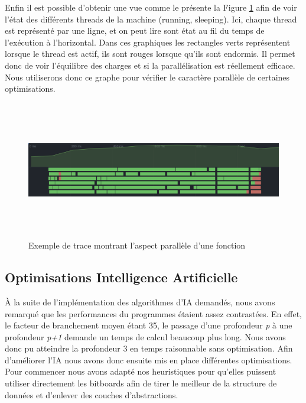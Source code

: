 \documentclass{article}
\begin{document}
Enfin il est possible d'obtenir une vue comme le présente la Figure \ref{thread_ex} afin de voir l'état des différents threads de la machine (running, sleeping). Ici, chaque thread est représenté
par une ligne, et on peut lire sont état au fil du temps de l'exécution à l'horizontal. Dans ces graphiques les rectangles verts
représentent lorsque le thread est actif, ils sont rouges lorsque qu'ils sont endormis. Il permet donc de voir l'équilibre des charges et si la parallélisation est réellement efficace.
Nous utiliserons donc ce graphe pour vérifier le caractère parallèle de certaines optimisations.

\begin{figure}[h]
    \centering
    \includegraphics[width=\textwidth,height=6.0cm,keepaspectratio]{threads_ex.png}
    \caption{Exemple de trace montrant l'aspect parallèle d'une fonction}
    \label{thread_ex}
\end{figure}
\FloatBarrier

\subsection{Optimisations Intelligence Artificielle}
À la suite de l'implémentation des algorithmes d'IA demandés, nous avons remarqué que les performances du programmes étaient assez contrastées. En effet, le facteur
de branchement moyen étant 35, le passage d'une profondeur \textit{p} à une profondeur \textit{p+1} demande un temps de calcul beaucoup plus long. Nous avons donc pu atteindre la profondeur 3
en temps raisonnable sans optimisation. Afin d'améliorer l'IA nous avons donc ensuite mis en place différentes optimisations. Pour commencer nous avons adapté nos heuristiques
pour qu'elles puissent utiliser directement les bitboards afin de tirer le meilleur de la structure de données et d'enlever des couches d'abstractions.
\end{document}
